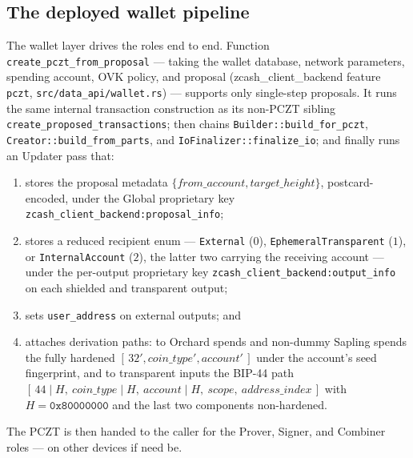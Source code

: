 \documentclass[11pt,a4paper]{article}
\theoremstyle{definition}
\begin{document}
\subsection{The deployed wallet pipeline}\label{sec:pczt-pipeline}

The wallet layer drives the roles end to end. Function
\texttt{create\_pczt\_from\_proposal} --- taking the wallet database,
network parameters, spending account, OVK policy, and proposal
(\textsf{zcash\_client\_backend} feature \texttt{pczt},
\texttt{src/data\_api/wallet.rs}) --- supports only single-step
proposals. It runs the same internal transaction construction as its
non-PCZT sibling \texttt{create\_proposed\_transactions}; then chains
\texttt{Builder::build\_for\_pczt},
\texttt{Creator::build\_from\_parts}, and
\texttt{IoFinalizer::finalize\_io}; and finally runs an Updater pass
that:
\begin{enumerate}
\item stores the proposal metadata $\{\mathit{from\_account},
  \mathit{target\_height}\}$, postcard-encoded, under the Global
  proprietary key \texttt{zcash\_client\_backend:proposal\_info};
\item stores a reduced recipient enum --- \texttt{External} ($0$),
  \texttt{EphemeralTransparent} ($1$), or \texttt{InternalAccount}
  ($2$), the latter two carrying the receiving account ---
  under the per-output proprietary key
  \texttt{zcash\_client\_backend:output\_info} on each shielded and
  transparent output;
\item sets \texttt{user\_address} on external outputs; and
\item attaches derivation paths: to Orchard spends and non-dummy Sapling
  spends the fully hardened
  $[\,32', \mathit{coin\_type}', \mathit{account}'\,]$ under the
  account's seed fingerprint, and to transparent inputs the BIP-44 path
  $[\,44 \mathbin{|} H,\ \mathit{coin\_type} \mathbin{|} H,\
  \mathit{account} \mathbin{|} H,\ \mathit{scope},\
  \mathit{address\_index}\,]$ with $H = \mathtt{0x80000000}$ and the last
  two components non-hardened.
\end{enumerate}
The PCZT is then handed to the caller for the Prover, Signer, and
Combiner roles --- on other devices if need be.
\end{document}
